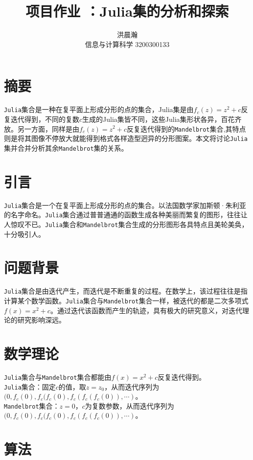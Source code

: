 \documentclass{ctexart}
\title{项目作业 ：Julia集的分析和探索}
\author{洪晨瀚 \\ 信息与计算科学 3200300133}
\begin{document}
\maketitle

\graphicspath{{image/}}


\section{摘要}
\verb|Julia|集合是一种在复平面上形成分形的点的集合，Julia集是由$f_c(z)=z^2+c$反复迭代得到，不同的复数$c$生成的Julia集皆不同，这些Julia集形状各异，百花齐放。另一方面，同样是由$f_c(z)=z^2+c$反复迭代得到的\verb|Mandelbrot|集合,其特点则是将其图像不停放大就能得到格式各样造型迥异的分形图案。本文将讨论\verb|Julia|集并合并分析其余\verb|Mandelbrot|集的关系。\cite{shishikura1998hausdorff}

\section{引言}
\verb|Julia|集合是一个在复平面上形成分形的点的集合。以法国数学家加斯顿·朱利亚的名字命名。\verb|Julia|集合通过普普通通的函数生成各种美丽而繁复的图形，往往让人惊叹不已。\verb|Julia|集合和\verb|Mandelbrot|集合生成的分形图形各具特点且美轮美奂，十分吸引人。

\section{问题背景}
\verb|Julia|集合是由迭代产生，而迭代是不断重复的过程。在数学上，该过程往往是指计算某个数学函数。\verb|Julia|集合与\verb|Mandelbrot|集合一样，被迭代的都是二次多项式$f(x)=x^2+c$。通过迭代该函数而产生的轨迹，具有极大的研究意义，对迭代理论的研究影响深远。

\section{数学理论}
\begin{flushleft}
  \verb|Julia|集合与\verb|Mandelbrot|集合都能由$f(x)=x^2+c$反复迭代得到。\\
  \verb|Julia|集合：固定$c$的值，取$z=z_0$，从而迭代序列为$(0,f_c(0),f_c(f_c(0),f_c(f_c(f_c(0)),\cdots)$。\\
  \verb|Mandelbrot|集合：$z=0$，$c$为复数参数，从而迭代序列为$(0,f_c(0),f_c(f_c(0),f_c(f_c(f_c(0)),\cdots)$。
\end{flushleft}

\section{算法}
\end{document}
